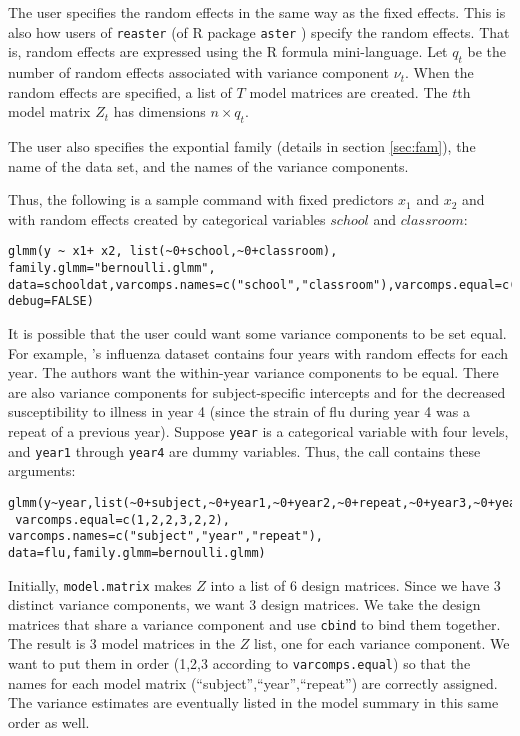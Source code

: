 \documentclass{article}
\newcommand{\pcite}[1]{\citeauthor{#1}'s \citeyearpar{#1}}
\begin{document}
The user  specifies the random effects in the same way as the fixed effects. This is also how users of  \texttt{reaster} (of R package
 \texttt{aster} \citep{aster-package}) specify the random effects. That is, random effects are expressed using the R formula mini-language. Let $q_t$ be the number of random effects associated with variance component $\nu_t$. When the random effects are specified, a list of $T$ model matrices are created. The $t$th model matrix $Z_t$ has dimensions $n \times q_t$.


The user also specifies the expontial family (details in section \ref{sec:fam}), the name of the data set, and the names of the variance components.  

Thus, the following is a sample command with fixed predictors $x_1$ and $x_2$ and with random effects created by categorical variables $school$ and $classroom$:
\begin{verbatim}
glmm(y ~ x1+ x2, list(~0+school,~0+classroom),  family.glmm="bernoulli.glmm", 
data=schooldat,varcomps.names=c("school","classroom"),varcomps.equal=c(1,2),
debug=FALSE)
 \end{verbatim} 

It is possible that the user could want some variance components to be set equal. For example, \pcite{coull:agresti:2000} influenza dataset contains four years with random effects for each year. The authors want the within-year variance components to be equal.  There are also variance components for subject-specific intercepts and for the decreased susceptibility to illness in year 4 (since the strain of flu during year 4 was a repeat of a previous year). Suppose \texttt{year} is a categorical variable with four levels, and \texttt{year1} through \texttt{year4} are dummy variables. Thus, the call  contains these arguments:
\begin{verbatim}
glmm(y~year,list(~0+subject,~0+year1,~0+year2,~0+repeat,~0+year3,~0+year4),
 varcomps.equal=c(1,2,2,3,2,2), varcomps.names=c("subject","year","repeat"),
data=flu,family.glmm=bernoulli.glmm)
\end{verbatim}

Initially, \texttt{model.matrix}  makes $Z$ into a list of 6 design matrices. Since we have 3 distinct variance components, we want 3 design matrices. We take the design matrices that share a variance component and use \texttt{cbind} to bind them together. The result is 3 model matrices in the $Z$ list, one for each variance component. We  want to put them in order (1,2,3 according to \texttt{varcomps.equal}) so that the names for each model matrix  (``subject'',``year'',``repeat'') are correctly assigned.  The variance estimates  are eventually listed in the model summary in this same order as well.
    
\end{document}
